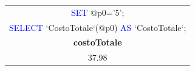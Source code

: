 \documentclass[10pt]{article}
\begin{document}
\begin{enumerate}[noitemsep]
\begin{center}
		\begin{table}[H]
		\centering
		\label{table:fun2}
		\begin{tabular}{|c|}
			\hline
				\textcolor{blue}{SET} \textcolor{amber}{@}p0='5'; \\
				\textcolor{blue}{SELECT} `CostoTotale`(\textcolor{amber}{@}p0) \textcolor{blue}{AS} `CostoTotale`;
			 \\ \hline
			 \textbf{costoTotale} \\ \hline
			 37.98 \\ \hline
		\end{tabular}
	\end{table}
\end{center}
\end{enumerate}
\end{document}
